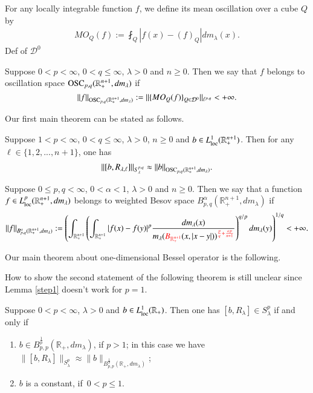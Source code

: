 \documentclass[12pt]{amsart}
\begin{document}
For any locally integrable function $f$, we define its mean oscillation over a cube $Q$ by
\begin{align*}
MO_Q(f):=\fint_{Q}|f(x)-(f)_Q|dm_\lambda(x).
\end{align*}
{\color{red}Def of $\mathcal{D}^0$}
\begin{definition}
Suppose $0<p<\infty$, $0<q\leq \infty$, $\lambda>0$ and $n\geq 0$. Then we say that $f$ belongs to oscillation space ${\rm OSC}_{p,q}(\mathbb{R}_+^{n+1},dm_\lambda)$ if $$\|f\|_{{\rm OSC}_{p,q}(\mathbb{R}_+^{n+1},dm_\lambda)}:=\|\{MO_Q(f)\}_{Q\in\mathcal{D}^0}\|_{\ell^{p,q}}<+\infty.$$
\end{definition}
Our first main theorem can be stated as follows.
\begin{theorem}
Suppose {\color{red}$1<p<\infty$}, $0<q\leq \infty$, $\lambda>0$, $n\geq 0$ and $b\in L^1_{\rm loc}(\mathbb{R}^{n+1}_+)$. Then for any $\ell\in\{1,2,...,n+1\}$, one has
\begin{align*}
\|[b,R_{\lambda,\ell}]\|_{S_\lambda^{p,q}}\approx\|b\|_{{\rm OSC}_{p,q}(\mathbb{R}_+^{n+1},dm_\lambda)}.
\end{align*}
\end{theorem}
\begin{definition}
Suppose $0\leq p,q< \infty$, $0<\alpha<1$, $\lambda>0$ and $n\geq 0$.  Then we say that a  function $f\in L^p_{{\rm loc}}(\mathbb{R}_+^{n+1},dm_\lambda)$ belongs to weighted Besov space $B_{p,q}^{\alpha}(\mathbb{R}_+^{n+1},dm_\lambda)$ if
\begin{align*}
\|f\|_{B_{p,q}^{\alpha}(\mathbb{R}_+^{n+1},dm_\lambda)}:=\left(\int_{\mathbb{R}_{+}^{n+1}}\left(\int_{\mathbb{R}_{+}^{n+1}}|f(x)-f(y)|^p\frac{dm_\lambda(x)}{{m_\lambda({\color{red}B_{\mathbb{R}_+^{n+1}}}(x,|x-y|))^{\color{red}\frac{p}{q}+\frac{\alpha p}{n+1}}}}\right)^{q/p}dm_\lambda(y)\right)^{1/q}<+\infty.
\end{align*}
\end{definition}

Our main theorem about one-dimensional Bessel operator is the following.

{\color{red} How to show the second statement of the following theorem is still unclear since Lemma \ref{step1} doesn't work for $p=1$.}
\begin{theorem}\label{schatten}
Suppose $0<p<\infty$, $\lambda>0$ and $b\in  L^1_{{\rm loc}}(\mathbb R_+)$. Then one has  $[b,R_{\lambda}]\in S_\lambda^p$
if and only if

\begin{enumerate}
\item $b\in B_{p,p}^{\frac{1}{p}}(\mathbb R_+,dm_\lambda)$, if {\color{red}$p>1$}; in this case we have $ \|[b,R_{\lambda}]\|_{S_\lambda^p}\approx \|b\|_{B_{p,p}^{\frac{1}{p}}(\mathbb R_+,dm_\lambda)}$;

\item {\color{red}$b$ is a constant, if\ $0<p\leq 1$}.

\end{enumerate}

\end{theorem}
\end{document}
